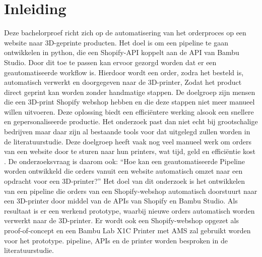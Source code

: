 


% 

\section{Inleiding}%
\label{sec:inleiding}

Deze bachelorproef richt zich op de automatisering van het orderproces op een website naar 3D-geprinte producten. Het doel is om een pipeline te gaan ontwikkelen in python, die een Shopify-API koppelt aan de API van Bambu Studio. Door dit toe te passen kan ervoor gezorgd worden dat er een geautomatiseerde workflow is. Hierdoor wordt een order, zodra het besteld is, automatisch verwerkt en doorgegeven naar de 3D-printer, Zodat het product direct geprint kan worden zonder handmatige stappen.
\vspace{1em}
De doelgroep zijn mensen die een 3D-print Shopify webshop hebben en die deze stappen niet meer manueel willen uitvoeren. Deze oplossing biedt een efficiëntere werking alsook een snellere en gepersonaliseerde productie. Het onderzoek past dan niet echt bij grootschalige bedrijven maar daar zijn al bestaande tools voor dat uitgelegd zullen worden in de literatuurstudie.
\vspace{1em}
Deze doelgroep heeft vaak nog veel manueel werk om orders van een website door te sturen naar hun printers, wat tijd, geld en efficiëntie kost . De onderzoeksvraag is daarom ook: “Hoe kan een geautomatiseerde Pipeline worden ontwikkeld die orders vanuit een website automatisch omzet naar een opdracht voor een 3D-printer?”
\vspace{1em}
Het doel van dit onderzoek is het ontwikkelen van een pipeline die orders van een Shopify-webshop automatisch doorstuurt naar een 3D-printer door middel van de APIs van Shopify en Bambu Studio. Als resultaat is er een werkend prototype, waarbij nieuwe orders automatisch worden verwerkt naar de 3D-printer. Er wordt ook een Shopify-webshop opgezet als proof-of-concept en een Bambu Lab  X1C Printer met AMS zal gebruikt worden voor het prototype. pipeline, APIs en de printer worden besproken in de literatuurstudie.


